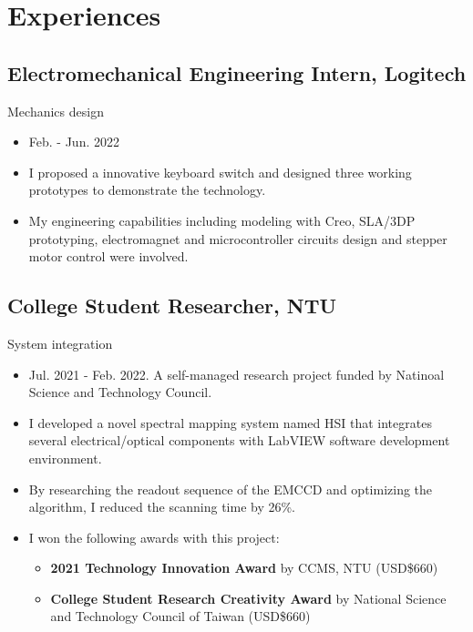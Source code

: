 \documentclass[12pt]{article}
\begin{document}
    \section*{Experiences
    }
        \subsection*{Electromechanical Engineering Intern, Logitech}
        {\sffamily
        Mechanics design
        \begin{itemize}
            \item Feb. - Jun. 2022
            \item I proposed a innovative keyboard switch and designed three working prototypes to demonstrate the technology.
            \item My engineering capabilities including modeling with Creo, SLA/3DP prototyping, electromagnet and microcontroller circuits design and stepper motor control were involved.
        \end{itemize}
        }
        \subsection*{College Student Researcher, NTU}
        {\sffamily
        System integration
        \begin{itemize}
            \item Jul. 2021 - Feb. 2022. A self-managed research project funded by Natinoal Science and Technology Council.
            \item I developed a novel spectral mapping system named HSI that integrates several electrical/optical components with LabVIEW software development environment. %
            \item By researching the readout sequence of the EMCCD and optimizing the algorithm, I reduced the scanning time by 26\%.
            \item I won the following awards with this project: 
            \begin{itemize}
                \item \textbf{2021 Technology Innovation Award} by CCMS, NTU (USD\$660)
                \item \textbf{College Student Research Creativity Award} by National Science and Technology Council of Taiwan (USD\$660)
            \end{itemize}
        \end{itemize}}
\end{document}
